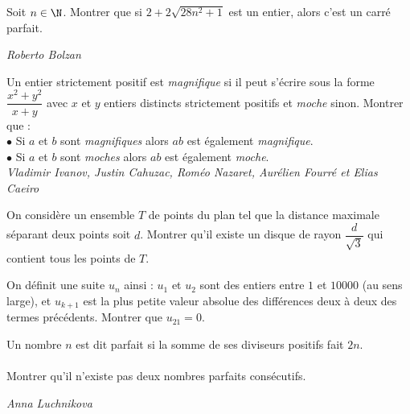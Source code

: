 \begin{exo}{}
Soit $n \in \N$. Montrer que si $2+2\sqrt{28n^2+1}$ est un entier, alors c'est un carré parfait.

\medskip
\textit{Roberto Bolzan}
\end{exo}



\begin{exo}{}
Un entier strictement positif est \textit{magnifique} si il peut s'écrire sous la forme $\dfrac{x^2+y^2}{x+y}$ avec $x$ et $y$ entiers distincts strictement positifs et \textit{moche} sinon. Montrer que :\\
$\bullet$ Si $a$ et $b$ sont \textit{magnifiques} alors $ab$ est également  \textit{magnifique}.\\
$\bullet$ Si $a$ et $b$ sont \textit{moches} alors $ab$ est également \textit{moche}.\\

\medskip
\textit{Vladimir Ivanov, Justin Cahuzac, Roméo Nazaret, Aurélien Fourré et Elias Caeiro}

\end{exo}



\begin{exo}{}
On considère un ensemble $T$ de points du plan tel que la distance maximale séparant deux points soit $d$. Montrer qu'il existe un disque de rayon $\dfrac{d}{\sqrt{3}}$ qui contient tous les points de $T$.
\end{exo}




\begin{exo}{}On définit une suite $u_{n}$ ainsi : $u_{1}$ et $u_{2}$ sont des entiers entre $1$ et $10000$ (au sens large), et $u_{k+1}$
est la plus petite valeur absolue des différences deux à deux des termes précédents. Montrer que
$u_{21} = 0$.

\end{exo}


\begin{exo}{}
Un nombre $n$ est dit parfait si la somme de ses diviseurs positifs fait $2n$.\\~~\\
Montrer qu'il n'existe pas deux nombres parfaits consécutifs.

\medskip
\textit{Anna Luchnikova}

\end{exo}




